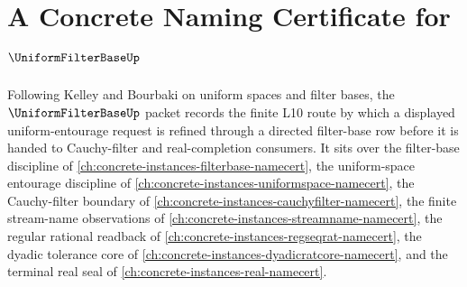 \chapter{A Concrete Naming Certificate for $\UniformFilterBaseUp$}
\label{ch:concrete-instances-uniform-filter-base-namecert}

Following Kelley and Bourbaki on uniform spaces and filter bases, the $\UniformFilterBaseUp$ packet records the finite L10 route by which a displayed uniform-entourage request is refined through a directed filter-base row before it is handed to Cauchy-filter and real-completion consumers. It sits over the filter-base discipline of \autoref{ch:concrete-instances-filterbase-namecert}, the uniform-space entourage discipline of \autoref{ch:concrete-instances-uniformspace-namecert}, the Cauchy-filter boundary of \autoref{ch:concrete-instances-cauchyfilter-namecert}, the finite stream-name observations of \autoref{ch:concrete-instances-streamname-namecert}, the regular rational readback of \autoref{ch:concrete-instances-regseqrat-namecert}, the dyadic tolerance core of \autoref{ch:concrete-instances-dyadicratcore-namecert}, and the terminal real seal of \autoref{ch:concrete-instances-real-namecert}.

